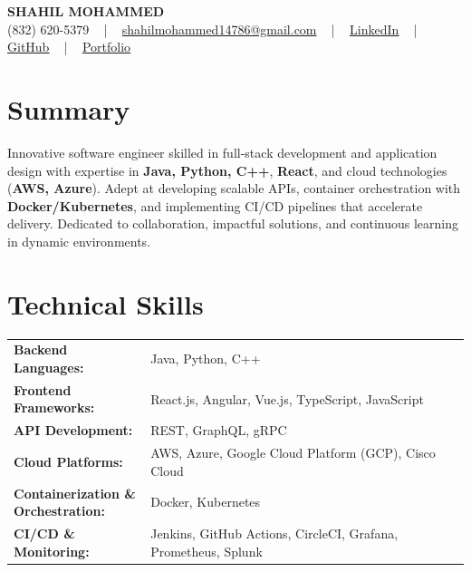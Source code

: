\documentclass[letterpaper,11pt]{article}
\begin{document}
\begin{center}
    {\fontsize{14pt}{12pt}\selectfont \textbf{\MakeUppercase{Shahil Mohammed}}}\\ \vspace{2pt}
    \fontsize{10pt}{12pt}\selectfont (832) 620-5379 ~ | ~ \href{mailto:shahilmohammed14786@gmail.com}{shahilmohammed14786@gmail.com} ~ | ~  
    \href{https://www.linkedin.com/in/shahil-mohammed-9652931a1/}{\color{blue}\underline{LinkedIn}}  ~ | ~ 
    \href{https://github.com/freakbeast14}{\color{blue}\underline{GitHub}} ~ | ~ 
    \href{https://shahil-mohammed.netlify.app/}{\color{blue}\underline{Portfolio}}
    \vspace{-8pt}
\end{center}

\section{Summary}
\fontsize{9pt}{10pt}\selectfont
Innovative software engineer skilled in full-stack development and application design with expertise in \textbf{Java, Python, C++}, \textbf{React}, and cloud technologies (\textbf{AWS, Azure}). Adept at developing scalable APIs, container orchestration with \textbf{Docker/Kubernetes}, and implementing CI/CD pipelines that accelerate delivery. Dedicated to collaboration, impactful solutions, and continuous learning in dynamic environments.
 \vspace{-5pt}
 
\section{Technical Skills}
        \vspace{-14pt}
        \begin{table}[h]
            \fontsize{9pt}{10pt}\selectfont
            \begin{tabular}{p{0.3\linewidth} p{0.7\linewidth}}
                \textbf{Backend Languages:} & Java, Python, C++ \\
                \textbf{Frontend Frameworks:} & React.js, Angular, Vue.js, TypeScript, JavaScript \\
                \textbf{API Development:} & REST, GraphQL, gRPC \\
                \textbf{Cloud Platforms:} & AWS, Azure, Google Cloud Platform (GCP), Cisco Cloud \\
                \textbf{Containerization \& Orchestration:} & Docker, Kubernetes \\
                \textbf{CI/CD \& Monitoring:} & Jenkins, GitHub Actions, CircleCI, Grafana, Prometheus, Splunk \\
            \end{tabular}
        \end{table}
 \vspace{-15pt}
 
\end{document}
